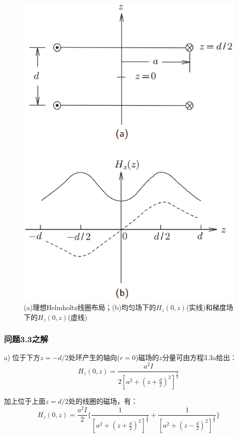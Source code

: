 \begin{figure}[htbp]
	\centering
	\includegraphics[scale=0.4]{chpt3/figs/fig3.24.eps}
	\caption{(a)理想Helmholtz线圈布局；(b)均匀场下的$H_z(0,z)$(实线)和梯度场下的$H_z(0,z)$(虚线)}
\end{figure}

\subsubsection{问题3.3之解}
a) 位于下方$z=−d/2$处环产生的轴向($r =0$)磁场的$z$分量可由方程3.3a给出：
\begin{equation}%
H_z(0,z)=\frac{a^2I}{2[a^2+(z+\frac{d}{2})^2]^\frac{3}{2}}
\end{equation}

加上位于上面$z=d/2$处的线圈的磁场，有：
\begin{equation}%
H_z(0,z)=\frac{a^2I}{2}\{\frac{1}{[a^2+(z+\frac{d}{2})^2]^\frac{3}{2}}+\frac{1}{[a^2+(z-\frac{d}{2})^2]^\frac{3}{2}}\}
\end{equation}

